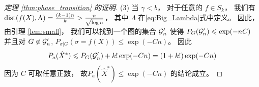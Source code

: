 \begin{proof}[定理 \ref{thm:phase_transition} 的证明]
	(3) 当 $\gamma < b$，
  对于任意的 $f\in S_k$，
  我们有
  $\operatorname{dist}(f(X), \Lambda) = \frac{(k-1)n}{k} > \frac{n}{\sqrt{\log n}}$，
  其中 $\Lambda$ 在\eqref{eq:Big_Lambda}式中定义。
	因此，由引理 \ref{lem:small}，
  我们可以找到一个图的集合 $\mathcal{G}'_n$
  使得 $P_G(\mathcal{G}'_n) \leqslant \exp(-nC)$
	并且对 $G\not \in \mathcal{G}'_n$, $P_{\sigma |G}(\sigma = f(X)) \leq \exp(-Cn)$。
  因此
	\begin{align*}
	P_a(\hat{X}^*) \leqslant P_G(\mathcal{G}'_n) + k! \exp(-Cn) = (1+k!)\exp(-Cn)
	\end{align*}
	因为 $C$
  可取任意正数，
	故$P_a(\hat{X}^*) \leq \exp(-Cn)$
  的结论成立。
\end{proof}
